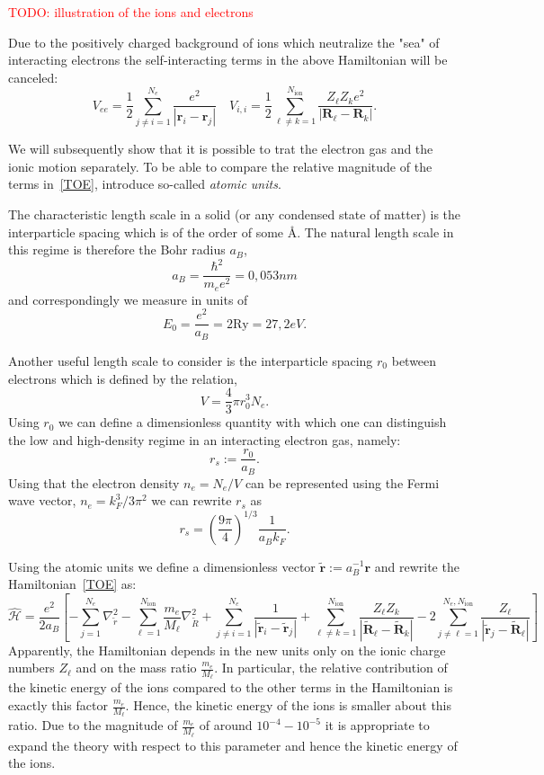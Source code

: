 \documentclass[11pt]{book}
\renewcommand{\vec}[1]{\bm{#1}}
\renewcommand{\H}{\hat{\mathcal{H}}}
\newcommand{\ion}{\text{ion}}
\newcommand{\Ry}{\text{Ry}}
\begin{document}
\textcolor{red}{TODO: illustration of the ions and electrons}

Due to the positively charged background of ions which neutralize the "sea" of interacting electrons the self-interacting terms in the above Hamiltonian will be canceled: \[V_{ee}= \frac{1}{2} \sum_{j \neq i = 1 }^{N_e} \frac{e^2}{\left|\vec{r}_i - \vec{r}_j\right|} \quad V_{i,i}= \frac{1}{2} \sum_{\ell \neq k = 1 }^{N_{\ion}} \frac{Z_{\ell}Z_{k}e^2}{\left|\vec{R}_{\ell} - \vec{R}_k\right|}.\]

We will subsequently show that it is possible to trat the electron gas and the ionic motion separately. To be able to compare the relative magnitude of the terms in~\eqref{TOE}, introduce so-called \textit{atomic units}.

The characteristic length scale in a solid (or any condensed state of matter) is the interparticle spacing which is of the order of some \AA. The natural length scale in this regime is therefore the Bohr radius $a_B$, \[a_B = \frac{\hbar^2}{m_e e^2} = 0,053 nm\] and correspondingly we measure in units of \[E_0 = \frac{e^2}{a_B} = 2 \Ry = 27,2 eV.\]

Another useful length scale to consider is the interparticle spacing $ r_0 $  between electrons which is defined by the relation, \[ V = \frac{4}{3} \pi r_0^3 N_e.\] Using $ r_0 $ we can define a dimensionless quantity with which one can  distinguish the low and high-density regime in an interacting electron gas, namely: \[r_s := \frac{r_0}{a_B}.\] Using that the electron density $ n_e = N_e / V $ can be represented using the Fermi wave vector, $ n_e = k_F^3 / 3\pi^2 $ we can rewrite $ r_s $ as \[ r_s = \left( \frac{9\pi}{4} \right)^{1/3} \frac{1}{a_B k_F}.\]  

Using the atomic units we define a dimensionless vector $ \tilde{\vec{r}} := a_B^{-1} \vec{r} $ and rewrite the Hamiltonian~\eqref{TOE} as:
\begin{equation}
  \H = \frac{e^2}{2a_B} \left[- \sum_{j=1}^{N_e} \nabla^2_{\tilde{r}}- \sum_{\ell=1}^{N_{\ion}} \frac{m_e}{M_{\ell}}\nabla^2_{\tilde{R}} + \sum_{j\neq i =1 }^{N_e} \frac{1}{\left| \tilde{\vec{r}}_i - \tilde{\vec{r}}_j\right| } + \sum_{\ell \neq k =1 }^{N_{\ion}} \frac{Z_{\ell}Z_k}{\left| \tilde{\vec{R}}_{\ell} - \tilde{\vec{R}}_k\right| } -2\sum_{j\neq \ell =1 }^{N_e, N_{\ion}} \frac{Z_{\ell}}{\left| \tilde{\vec{r}}_j - \tilde{\vec{R}}_{\ell}\right| } \right]
\end{equation}
Apparently, the Hamiltonian depends in the new units only on the ionic charge numbers $Z_{\ell}$ and on the mass ratio $ \frac{m_e}{M_\ell} $. In particular, the relative contribution of the kinetic energy of the ions compared to the other terms in the Hamiltonian is exactly this factor $ \frac{m_e}{M_{\ell}} $. Hence, the kinetic energy of the ions is smaller about this ratio. Due to the magnitude of $ \frac{m_e}{M_{\ell}} $ of around $10^{-4} - 10^{-5}$ it is appropriate to expand the theory with respect to this parameter and hence the kinetic energy of the ions.
\end{document}
